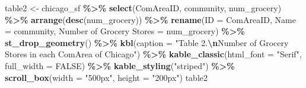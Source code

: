 \documentclass[
]{article}
\newenvironment{Shaded}{\begin{snugshade}}{\end{snugshade}}
\newcommand{\AttributeTok}[1]{\textcolor[rgb]{0.13,0.29,0.53}{#1}}
\newcommand{\ConstantTok}[1]{\textcolor[rgb]{0.56,0.35,0.01}{#1}}
\newcommand{\FunctionTok}[1]{\textcolor[rgb]{0.13,0.29,0.53}{\textbf{#1}}}
\newcommand{\NormalTok}[1]{#1}
\newcommand{\OtherTok}[1]{\textcolor[rgb]{0.56,0.35,0.01}{#1}}
\newcommand{\SpecialCharTok}[1]{\textcolor[rgb]{0.81,0.36,0.00}{\textbf{#1}}}
\newcommand{\StringTok}[1]{\textcolor[rgb]{0.31,0.60,0.02}{#1}}
\begin{document}
\begin{Shaded}
\begin{Highlighting}[]
\NormalTok{table2 }\OtherTok{\textless{}{-}}\NormalTok{ chicago\_sf }\SpecialCharTok{\%\textgreater{}\%}
  \FunctionTok{select}\NormalTok{(ComAreaID, community, num\_grocery) }\SpecialCharTok{\%\textgreater{}\%}
  \FunctionTok{arrange}\NormalTok{(}\FunctionTok{desc}\NormalTok{(num\_grocery)) }\SpecialCharTok{\%\textgreater{}\%}
  \FunctionTok{rename}\NormalTok{(}\AttributeTok{ID =}\NormalTok{ ComAreaID,}
         \AttributeTok{Name =}\NormalTok{ community,}
         \StringTok{\textasciigrave{}}\AttributeTok{Number of Grocery Stores}\StringTok{\textasciigrave{}} \OtherTok{=}\NormalTok{ num\_grocery) }\SpecialCharTok{\%\textgreater{}\%}
  \FunctionTok{st\_drop\_geometry}\NormalTok{() }\SpecialCharTok{\%\textgreater{}\%}
  \FunctionTok{kbl}\NormalTok{(}\AttributeTok{caption =} \StringTok{"Table 2.}\SpecialCharTok{\textbackslash{}n}\StringTok{Number of Grocery Stores in each ComArea of Chicago"}\NormalTok{) }\SpecialCharTok{\%\textgreater{}\%}
  \FunctionTok{kable\_classic}\NormalTok{(}\AttributeTok{html\_font =} \StringTok{"Serif"}\NormalTok{,}
                \AttributeTok{full\_width =} \ConstantTok{FALSE}\NormalTok{) }\SpecialCharTok{\%\textgreater{}\%}
  \FunctionTok{kable\_styling}\NormalTok{(}\StringTok{"striped"}\NormalTok{) }\SpecialCharTok{\%\textgreater{}\%}
  \FunctionTok{scroll\_box}\NormalTok{(}\AttributeTok{width =} \StringTok{"500px"}\NormalTok{, }\AttributeTok{height =} \StringTok{"200px"}\NormalTok{)}
\NormalTok{table2}
\end{Highlighting}
\end{Shaded}
\end{document}
